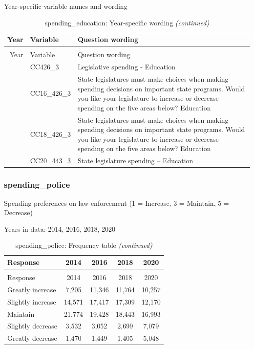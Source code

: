 \documentclass[
  12pt]{article}
\begin{document}
Year-specific variable names and
wording\begingroup\fontsize{11}{13}\selectfont

\begin{longtable}[t]{rl>{\raggedright\arraybackslash}p{10cm}}
\caption{\label{tab:unnamed-chunk-5}spending\_education: Year-specific wording}\\
\toprule
Year & Variable & Question wording\\
\midrule
\endfirsthead
\caption[]{spending\_education: Year-specific wording \textit{(continued)}}\\
\toprule
Year & Variable & Question wording\\
\midrule
\endhead

\endfoot
\bottomrule
\endlastfoot
2014 & CC426\_3 & Legislative spending - Education\\
\addlinespace
2016 & CC16\_426\_3 & State legislatures must make choices when making spending decisions on important state programs. Would you like your legislature to increase or decrease spending on the five areas below? Education\\
\addlinespace
2018 & CC18\_426\_3 & State legislatures must make choices when making spending decisions on important state programs. Would you like your legislature to increase or decrease spending on the five areas below? Education\\
\addlinespace
2020 & CC20\_443\_3 & State legislature spending -- Education\\*
\end{longtable}
\endgroup{}

\hypertarget{spending_police}{%
\subsubsection{spending\_police}\label{spending_police}}

Spending preferences on law enforcement (1 = Increase, 3 = Maintain, 5 =
Decrease)

Years in data: 2014, 2016, 2018,
2020\begingroup\fontsize{10}{12}\selectfont

\begin{longtable}[t]{lcccc}
\caption{\label{tab:unnamed-chunk-5}spending\_police: Frequency table}\\
\toprule
Response & 2014 & 2016 & 2018 & 2020\\
\midrule
\endfirsthead
\caption[]{spending\_police: Frequency table \textit{(continued)}}\\
\toprule
Response & 2014 & 2016 & 2018 & 2020\\
\midrule
\endhead

\endfoot
\bottomrule
\endlastfoot
Greatly increase & 7,205 & 11,346 & 11,764 & 10,257\\
Slightly increase & 14,571 & 17,417 & 17,309 & 12,170\\
Maintain & 21,774 & 19,428 & 18,443 & 16,993\\
Slightly decrease & 3,532 & 3,052 & 2,699 & 7,079\\
Greatly decrease & 1,470 & 1,449 & 1,405 & 5,048\\*
\end{longtable}
\endgroup{}
\end{document}
